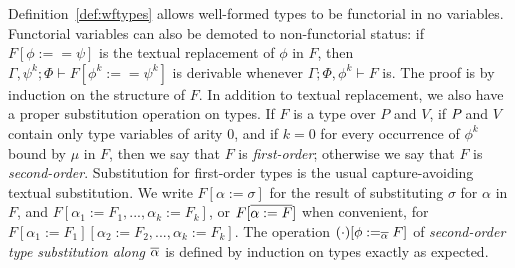 \documentclass[runningheads]{llncs}
\begin{document}
Definition~\ref{def:wftypes} allows well-formed types to be functorial
in no variables. Functorial variables can also be demoted to
non-functorial status: if $F[\phi :== \psi]$ is the textual
replacement of $\phi$ in $F$, then $\Gamma, \psi^k; \Phi \vdash
F[\phi^k :== \psi^k]$ is derivable whenever $\Gamma; \Phi, \phi^k
\vdash F$ is.
The proof is by induction on the structure of $F$.  In addition to
textual replacement, we also have a proper substitution operation on
types. If $F$ is a type over $P$ and $V$, if $P\!$ and $V$ contain
only type variables of arity $0$, and if $k=0$ for every occurrence of
$\phi^k$ bound by $\mu$ in $F$, then we say that $F$ is {\em
  first-order}; otherwise we say that $F$ is {\em second-order}.
Substitution for first-order types is the usual capture-avoiding
textual substitution. We write $F[\alpha := \sigma]$ for the result of
substituting $\sigma$ for $\alpha$ in $F$, and $F[\alpha_1 :=
  F_1,...,\alpha_k := F_k]$, or $F[\overline{\alpha := F}]$ when convenient,
for $F[\alpha_1 := F_1][\alpha_2 := F_2,...,\alpha_k := F_k]$. The
operation $(\cdot)[\phi :=_{\overline{\alpha}} F]$ of {\em second-order type
  substitution along $\overline{\alpha}$} is defined by induction on types
exactly as expected.
\end{document}
